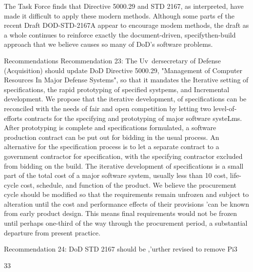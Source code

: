 \documentclass[12pt]{article}
\begin{document}
The Task Force finds that Directive 5000.29 and STD 2167, as interpreted,
have made it difficult to apply these modern methods.
Although some parts ef the recent Draft DOD-STD-2167A appear to encourage modem
methods, the draft as a whole continues to reinforce exactly the document-driven, specifythen-build approach that we believe causes so many of DoD's software problems.

Recommendations
Recommendation 23: The Uv~dersecretary of Defense (Acquisition) should
update DoD Directive 5000.29, "Management of Computer Resources In Major
Defense Systems", so that it mandates the Iterative setting of specifications,
the rapid prototyping of specified systpems, and Incremental development.
We propose that the iterative development, of specifications can be reconciled with
the needs of fair and open competition by letting two level-of-efforts contracts for the
specifying and prototyping of major software systeLms. After prototyping is complete and
specifications formulated, a software production contract can be put out for bidding in the
usual process.
An alternative for the specification process is to let a separate contract to a government
contractor for specification, with the specifying contractor excluded from bidding on the
build.
The iterative development of specifications is a small part of the total cost of a major
software system, usually less than 10%
cost, life-cycle cost, schedule, and function of the product.
We believe the procurement cycle should be modified so that the requirements remain
unfrozen and subject to alteration until the cost and performance effects of their provisions
'can be known from early product design. This means final requirements would not be
frozen until perhaps one-third of the way through the procurement period, a substantial
departure from present practice.

Recommendation 24: DoD STD 2167 should be ,'urther revised to remove
Pi3

33
\end{document}
